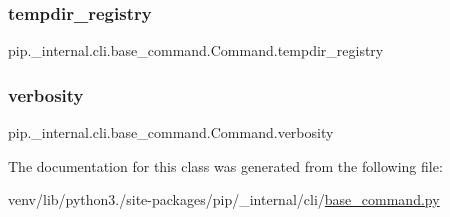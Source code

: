 \subsubsection{\texorpdfstring{tempdir\+\_\+registry}{tempdir\_registry}}
{\footnotesize\ttfamily pip.\+\_\+internal.\+cli.\+base\+\_\+command.\+Command.\+tempdir\+\_\+registry}

\mbox{\label{classpip_1_1__internal_1_1cli_1_1base__command_1_1Command_a958ba174a0d03ffa3cfdd3cb2b6d3b9e}} 
\subsubsection{\texorpdfstring{verbosity}{verbosity}}
{\footnotesize\ttfamily pip.\+\_\+internal.\+cli.\+base\+\_\+command.\+Command.\+verbosity}



The documentation for this class was generated from the following file\+:\begin{DoxyCompactItemize}
\item 
venv/lib/python3./site-\/packages/pip/\+\_\+internal/cli/\hyperlink{base__command_8py}{base\+\_\+command.\+py}\end{DoxyCompactItemize}
